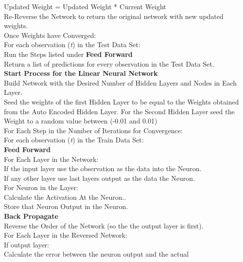 \documentclass[twoside,11pt]{article}
\newcommand\tab[1][1cm]{\hspace*{#1}}
\begin{document}
\tab \tab \tab \tab \tab \tab Updated Weight = Updated Weight * Current Weight\\
\tab \tab \tab Re-Reverse the Network to return the original network with new updated\\ 
\tab \tab \tab weights.\\
\tab Once Weights have Converged:\\
\tab For each observation (\textit{t}) in the Test Data Set:\\
\tab \tab Run the Steps listed under \textbf{Feed Forward}\\
\tab Return a list of predictions for every observation in the Test Data Set. \\
\textbf{Start Process for the Linear Neural Network}\\
Build Network with the Desired Number of Hidden Layers and Nodes in Each Layer.\\
Seed the weights of the first Hidden Layer to be equal to the Weights obtained from the Auto Encoded Hidden Layer. 
For the Second Hidden Layer seed the Weight to a random value between (-0.01 and 0.01) \\
For Each Step in the Number of Iterations for Convergence:\\
\tab For each observation (\textit{t}) in the Train Data Set:\\
\tab \tab \textbf{Feed Forward}\\
\tab \tab \tab For Each Layer in the Network:\\
\tab \tab \tab \tab If the input layer use the observation as the data into the Neuron.\\
\tab \tab \tab \tab If any other layer use last layers output as the data the Neuron.\\
\tab \tab \tab \tab  For Neuron in the Layer:\\
\tab \tab \tab \tab \tab Calculate the Activation At the Neuron..\\
\tab \tab \tab \tab \tab Store that Neuron Output in the Neuron.\\
\tab \tab \textbf{Back Propagate} \\
\tab \tab \tab Reverse the Order of the Network (so the the output layer is first).\\
\tab \tab \tab For Each Layer in the Reversed Network:\\
\tab \tab \tab \tab If output layer:\\
\tab \tab \tab \tab \tab Calculate the error between the neuron output and the actual\\ 
\end{document}
